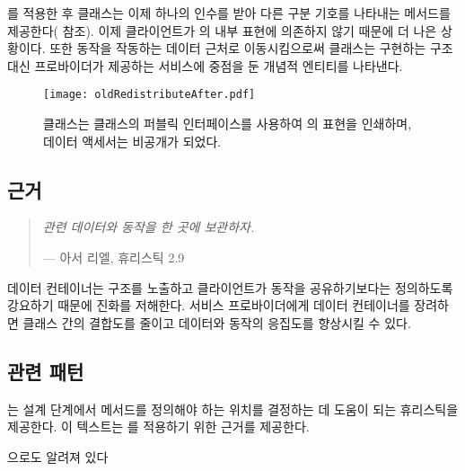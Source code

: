 \documentclass[a4paper,10pt,twoside]{book}
\begin{document}
를 적용한 후  클래스는 이제 하나의 인수를 받아 다른 구분 기호를 나타내는  메서드를 제공한다( 참조). 이제 클라이언트가 의 내부 표현에 의존하지 않기 때문에 더 나은 상황이다. 또한 동작을 작동하는 데이터 근처로 이동시킴으로써 클래스는 구현하는 구조 대신 프로바이더가 제공하는 서비스에 중점을 둔 개념적 엔티티를 나타낸다.

\begin{figure}
\begin{center}
\texttt{[image: oldRedistributeAfter.pdf]}
\caption{ 클래스는  클래스의 퍼블릭 인터페이스를 사용하여 의 표현을 인쇄하며, 데이터 액세서는 비공개가 되었다.}
\end{center}
\end{figure}


\subsection*{근거}

\begin{quotation}
\emph{관련 데이터와 동작을 한 곳에 보관하자.}

\hfill  --- 아서 리엘, 휴리스틱 2.9 \cite{Riel96a}
\end{quotation}

데이터 컨테이너는 구조를 노출하고 클라이언트가 동작을 공유하기보다는 정의하도록 강요하기 때문에 진화를 저해한다. 서비스 프로바이더에게 데이터 컨테이너를 장려하면 클래스 간의 결합도를 줄이고 데이터와 동작의 응집도를 향상시킬 수 있다.

\subsection*{관련 패턴}

는 설계 단계에서 메서드를 정의해야 하는 위치를 결정하는 데 도움이 되는 휴리스틱을 제공한다. 이 텍스트는 를 적용하기 위한 근거를 제공한다.


 \cite{Lieb88a}으로도 알려져 있다
\end{document}
